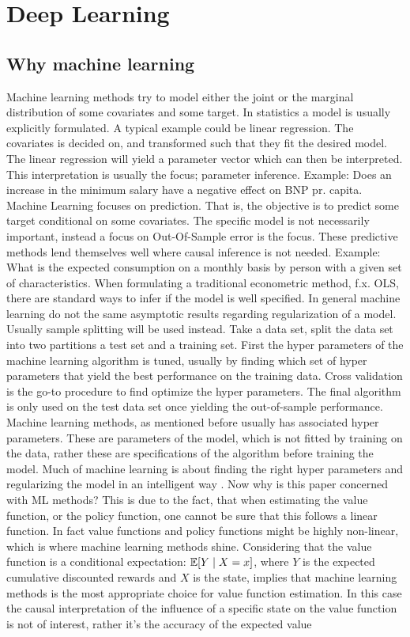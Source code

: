 \section{Deep Learning}
\label{sec:deep_learning}


\subsection{Why machine learning}

Machine learning methods try to model either the joint or the marginal distribution of some covariates and some target. In statistics a model is usually explicitly formulated. A typical example could be linear regression. The covariates is decided on, and transformed such that they fit the desired model. The linear regression will yield a parameter vector which can then be interpreted. This interpretation is usually the focus; parameter inference. Example: Does an increase in the minimum salary have a negative effect on BNP pr. capita. Machine Learning focuses on prediction. That is, the objective is to predict some target conditional on some covariates. The specific model is not necessarily important, instead a focus on Out-Of-Sample error is the focus. These predictive methods lend themselves well where causal inference is not needed. Example: What is the expected consumption on a monthly basis by person with a given set of characteristics. When formulating a traditional econometric method, f.x. OLS, there are standard ways to infer if the model is well specified. In general machine learning do not the same asymptotic results regarding regularization of a model. Usually sample splitting will be used instead. Take a data set, split the data set into two partitions a test set and a training set. First the hyper parameters of the machine learning algorithm is tuned, usually by finding which set of hyper parameters that yield the best performance on the training data. Cross validation is the go-to procedure to find optimize the hyper parameters. The final algorithm is only used on the test data set once yielding the out-of-sample performance. Machine learning methods, as mentioned before usually has associated hyper parameters. These are parameters of the model, which is not fitted by training on the data, rather these are specifications of the algorithm before training the model. Much of machine learning is about finding the right hyper parameters and regularizing the model in an intelligent way \parencite{friedman_elements_2001}. Now why is this paper concerned with ML methods? This is due to the fact, that when estimating the value function, or the policy function, one cannot be sure that this follows a linear function. In fact value functions and policy functions might be highly non-linear, which is where machine learning methods shine. Considering that the value function is a conditional expectation: $ \mathbb{E}[Y \mid X=x]$, where $Y$ is the expected cumulative discounted rewards and $X$ is the state, implies that machine learning methods is the most appropriate choice for value function estimation.  In this case the causal interpretation of the influence of a specific state on the value function is not of interest, rather it's the accuracy of the expected value 